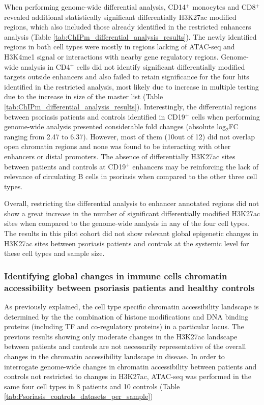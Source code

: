 When performing genome-wide differential analysis, CD14$^+$ monocytes and CD8$^+$ revealed additional statistically significant differentially H3K27ac modified regions, which also included those already identified in the restricted enhancers analysis (Table \ref{tab:ChIPm_differential_analysis_results}). The newly identified regions in both cell types were mostly in regions lacking of ATAC-seq and H3K4me1 signal or interactions with nearby gene regulatory regions. Genome-wide analysis in CD4$^+$ cells did not identify significant differentially modified targets outside enhancers and also failed to retain significance for the four hits identified in the restricted analysis, most likely due to increase in multiple testing due to the increase in size of the master list (Table \ref{tab:ChIPm_differential_analysis_results}). Interestingly, the differential regions between psoriasis patients and controls identified in CD19$^+$ cells when performing genome-wide analysis presented considerable fold changes (absolute log$_2$FC ranging from 2.47 to 6.37). However, most of them (10out of 12) did not overlap open chromatin regions and none was found to be interacting with other enhancers or distal promoters. The absence of differentially H3K27ac sites between patients and controls at CD19$^+$ enhancers may be reinforcing the lack of relevance of circulating B cells in psoriasis when compared to the other three cell types.

Overall, restricting the differential analysis to enhancer annotated regions did not show a great increase in the number of significant differentially modified H3K27ac sites when compared to the genome-wide analysis in any of the four cell types. The results in this pilot cohort did not show relevant global epigenetic changes in H3K27ac sites between psoriasis patients and controls at the systemic level for these cell types and sample size.


\subsubsection{Identifying global changes in immune cells chromatin accessibility between psoriasis patients and healthy controls}

As previously explained, the cell type specific chromatin accessibility landscape is determined by the the combination of histone modifications and DNA binding proteins (including TF and co-regulatory proteins) in a particular locus. The previous results showing only moderate changes in the H3K27ac landscape between patients and controls are not necessarily representative of the overall changes in the chromatin accessibility landscape in disease. In order to interrogate genome-wide changes in chromatin accessibility between patients and controls not restricted to changes in H3K27ac, ATAC-seq was performed in the same four cell types in 8 patients and 10 controls (Table \ref{tab:Psoriasis_controls_datasets_per_sample})

